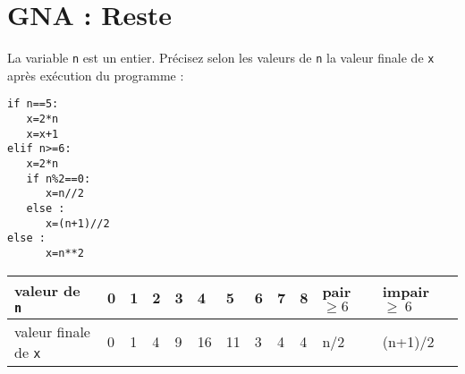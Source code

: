\section{GNA : Reste}

%


\begin{exercice}
La variable \verb?n? est un entier. Pr\' ecisez selon les valeurs de \verb?n? la valeur finale de \verb?x? apr\` es ex\' ecution du programme :
\begin{verbatim}
if n==5:
   x=2*n
   x=x+1
elif n>=6:
   x=2*n
   if n%2==0:
      x=n//2
   else :
      x=(n+1)//2         
else :
      x=n**2
\end{verbatim}
\end{exercice}
\bigskip

\begin{solution}
\begin{tabular}{l|l|l|l|l|l|l|l|l|l|l|l}
valeur de \verb?n? &0&1&2&3&4&5&6&7&8&pair $\geq 6$ &impair $\geq\ 6$ \\ \hline
valeur finale de \verb?x? & 0&1&4&9&16&11&3&4&4&n/2&(n+1)/2
\end{tabular}
\end{solution}

